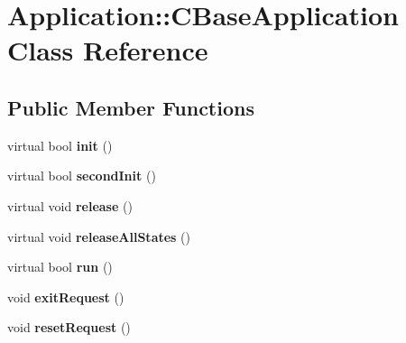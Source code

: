 \hypertarget{class_application_1_1_c_base_application}{}\section{Application\+::C\+Base\+Application Class Reference}
\label{class_application_1_1_c_base_application}
\subsection*{Public Member Functions}
\begin{DoxyCompactItemize}
\item 
\mbox{\label{class_application_1_1_c_base_application_a98e236820183dedfb8031f73dcc1187b}} 
virtual bool {\bfseries init} ()
\item 
\mbox{\label{class_application_1_1_c_base_application_a99e542fef878bcc83ce39719d78fc79a}} 
virtual bool {\bfseries second\+Init} ()
\item 
\mbox{\label{class_application_1_1_c_base_application_a93ece992dd0dc19fe7d5072132d88205}} 
virtual void {\bfseries release} ()
\item 
\mbox{\label{class_application_1_1_c_base_application_a1165f8215322f4ee88ffcf60f8c9687e}} 
virtual void {\bfseries release\+All\+States} ()
\item 
\mbox{\label{class_application_1_1_c_base_application_a2093051da39d09ecffccce01e9627a55}} 
virtual bool {\bfseries run} ()
\item 
\mbox{\label{class_application_1_1_c_base_application_a9d979cd20a14e3b0e39140d9097549c5}} 
void {\bfseries exit\+Request} ()
\item 
\mbox{\label{class_application_1_1_c_base_application_a1c440ea425b66a4c0de8217e33e405c8}} 
void {\bfseries reset\+Request} ()
\item 
\mbox{\label{class_application_1_1_c_base_application_a1766b527a0792f63248b305c67930c95}} 

\end{DoxyCompactItemize}

